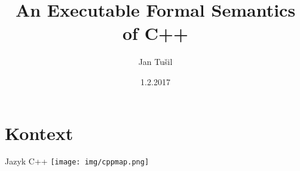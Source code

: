 \documentclass[11pt]{beamer}
\author{Jan Tušil}
\title{An Executable Formal Semantics of C++}
\institute{FI MU}
\date{1.2.2017}
\begin{document}




\begin{frame}
\titlepage
\end{frame}


\begin{frame}
\tableofcontents
\end{frame}



\section{Kontext}

% 
\begin{frame}{Jazyk C++}
\texttt{[image: img/cppmap.png]}
\end{frame}


\end{document}

